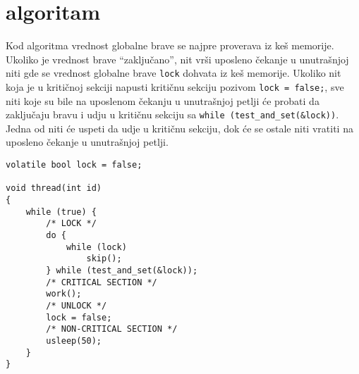 \clearpage
\section{ algoritam}
Kod \textbf{} algoritma vrednost globalne brave se najpre proverava iz ke\v{s} memorije. Ukoliko je vrednost brave ``zaklju\v{c}ano'', nit vr\v{s}i uposleno \v{c}ekanje u unutra\v{s}njoj niti gde se vrednost globalne brave \texttt{lock} dohvata iz ke\v{s} memorije. Ukoliko nit koja je u kriti\v{c}noj sekciji napusti kriti\v{c}nu sekciju pozivom \texttt{lock = false;}, sve niti koje su bile na uposlenom \v{c}ekanju u unutra\v{s}njoj petlji \'{c}e probati da zaklju\v{c}aju bravu i udju u kriti\v{c}nu sekciju sa  \texttt{while (test\_and\_set(\&lock))}. Jedna od niti \'{c}e uspeti da udje u kriti\v{c}nu sekciju, dok \'{c}e se ostale niti vratiti na uposleno \v{c}ekanje u unutra\v{s}njoj petlji.
\begin{lstlisting}
volatile bool lock = false;

void thread(int id)
{
    while (true) {
		/* LOCK */
        do {
			while (lock)
				skip();
		} while (test_and_set(&lock));
		/* CRITICAL SECTION */
		work();
		/* UNLOCK */
		lock = false;
		/* NON-CRITICAL SECTION */
        usleep(50);
    }
}
\end{lstlisting}